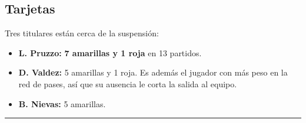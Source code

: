 \documentclass[11pt, a4paper]{article}
\newcommand{\mR}[1]{\textbf{#1}}
\begin{document}
\subsection*{Tarjetas}
Tres titulares están cerca de la suspensión:
\begin{itemize}
  \item \textbf{L. Pruzzo:} \mR{7 amarillas y 1 roja} en 13 partidos.
  \item \textbf{D. Valdez:} 5 amarillas y 1 roja. Es además el jugador con más peso en la red de pases, así que su ausencia le corta la salida al equipo.
  \item \textbf{B. Nievas:} 5 amarillas.
\end{itemize}

\vspace{1mm}
\hrule
\vspace{1mm}
\end{document}
